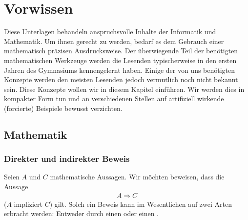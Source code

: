 \chapter{Vorwissen}\label{ch:Kapitel00}
Diese Unterlagen behandeln anspruchsvolle Inhalte der Informatik und Mathematik. Um ihnen gerecht zu werden, bedarf es dem Gebrauch einer mathematisch präzisen Ausdrucksweise. Der überwiegende Teil der benötigten mathematischen Werkzeuge werden die Lesenden typischerweise in den ersten Jahren des Gymnasiums kennengelernt haben. Einige der von uns benötigten Konzepte werden den meisten Lesenden jedoch vermutlich noch nicht bekannt sein. Diese Konzepte wollen wir in diesem Kapitel einführen. Wir werden dies in kompakter Form tun und an verschiedenen Stellen auf artifiziell wirkende (forcierte) Beispiele bewusst verzichten.

\section{Mathematik}
\subsection{Direkter und indirekter Beweis}
Seien $A$ und $C$ mathematische Aussagen. Wir möchten beweisen, dass die Aussage
\begin{align*}
    A\Rightarrow C
\end{align*}
($A$ impliziert $C$) gilt. Solch ein Beweis kann im Wesentlichen auf zwei Arten erbracht werden: Entweder durch einen  oder einen .

